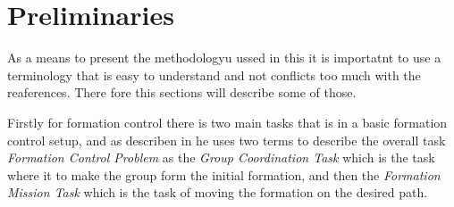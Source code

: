 \section{Preliminaries}
As a means to present the methodologyu ussed in this it is importatnt
to use a terminology that is easy to understand and not conflicts too
much with the reaferences. There fore this sections will describe some
of those.

Firstly for formation control there is two main tasks that is in a
basic formation control setup, and as describen in \citep{thorvaldsen}
he uses two terms to describe the overall task \textit{Formation
Control Problem} as the  \textit{Group Coordination Task} which is the
task where it to make the group form the initial formation, and then
the \textit{Formation Mission Task} which is the task of moving the
formation on the desired path. 

